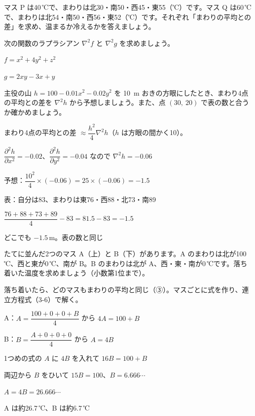 \begingroup{}%
\noindent\begin{minipage}[t]{0.49\linewidth}
\begin{jibun}
\raggedright マス P は40\,℃で、まわりは北30・南50・西45・東55（℃）です。マス Q は60\,℃で、まわりは北54・南50・西56・東52（℃）です。それぞれ「まわりの平均との差」を求め、温まるか冷えるかを答えましょう。
\end{jibun}
\end{minipage}\hfill
\begin{minipage}[t]{0.49\linewidth}
\begin{jibun}
\raggedright 次の関数のラプラシアン $\nabla^2f$ と $\nabla^2g$ を求めましょう。\par\vspace{2pt}
$f=x^2+4y^2+z^2$\par
$g=2xy-3x+y$
\end{jibun}
\end{minipage}\par
\endgroup

\begin{reidai}
主役の山 $h=100-0.01x^2-0.02y^2$ を \qty{10}{m} おきの方眼にしたとき、まわり4点の平均との差を $\nabla^2h$ から予想しましょう。また、点 $(30,\ 20)$ で表の数と合うか確かめましょう。\par
\kangaekata まわり4点の平均との差 $\approx\dfrac{h^2}{4}\nabla^2h$（$h$ は方眼の間かく10）。\par
\shiki $\dfrac{\partial^2h}{\partial x^2}=-0.02$、$\dfrac{\partial^2h}{\partial y^2}=-0.04$ なので $\nabla^2h=-0.06$\par
\kviiimq 予想：$\dfrac{10^2}{4}\times(-0.06)=25\times(-0.06)=-1.5$\par
\kviiimq 表：自分は83、まわりは東76・西88・北73・南89\par
\kviiimq $\dfrac{76+88+73+89}{4}-83=81.5-83=-1.5$\par
\kotae どこでも $-1.5$\,m。表の数と同じ
\end{reidai}

\begin{reidai}[落ち着いた温度を連立方程式で]
たてに並んだ2つのマス A（上）と B（下）があります。A のまわりは北が100\,℃、西と東が0\,℃、南が B。B のまわりは北が A、西・東・南が0\,℃です。落ち着いた温度を求めましょう（小数第1位まで）。\par
\kangaekata 落ち着いたら、どのマスもまわりの平均と同じ（③）。マスごとに式を作り、連立方程式（3-6）で解く。\par
\shiki A：$A=\dfrac{100+0+0+B}{4}$ から $4A=100+B$\par
\kviiimq B：$B=\dfrac{A+0+0+0}{4}$ から $A=4B$\par
\kviiimq 1つめの式の $A$ に $4B$ を入れて $16B=100+B$\par
\kviiimq 両辺から $B$ をひいて $15B=100$、$B=6.666\cdots$\par
\kviiimq $A=4B=26.666\cdots$\par
\kotae A は約26.7\,℃、B は約6.7\,℃
\end{reidai}

